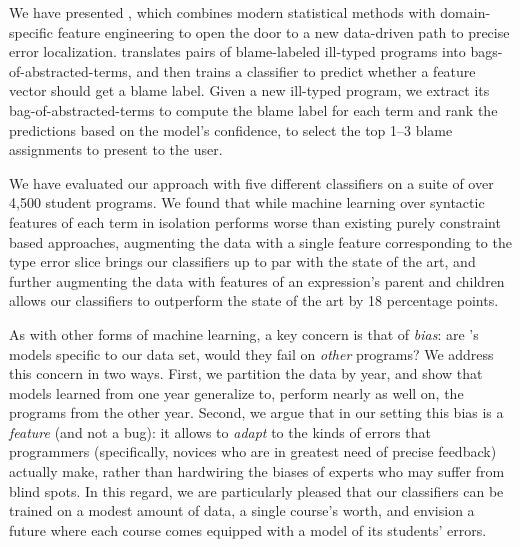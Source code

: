 \label{sec:conclusion}

We have presented \toolname, which
combines modern statistical methods
with domain-specific feature engineering
to open the door to a new data-driven
path to precise error localization.
%
\toolname
translates pairs of
blame-labeled ill-typed
programs into bags-of-abstracted-terms,
and then trains a classifier
to predict whether a feature vector
should get a blame label.
%
Given a new ill-typed program,
we extract its bag-of-abstracted-terms
to compute the blame label for each
term and rank the predictions based
on the model's confidence, to select
the top 1--3 blame assignments to
present to the user.

We have evaluated our approach with
five different classifiers on a suite
of over 4,500 student programs.
%
We found that while machine learning
over syntactic features of each term in isolation
performs worse than existing
purely constraint based approaches, %
augmenting the data with a single feature corresponding to
the type error slice brings our
classifiers up to par with the state of the art,
and further augmenting the data with
features of an expression's parent and children
allows our classifiers to outperform
the state of the art by 18 percentage points.



As with other forms of machine learning,
a key concern is that of \emph{bias}: are
\toolname's models specific
to our data set, would they fail on
\emph{other} programs?
%
We address this concern in two ways.
%
First, we partition the data by year,
and show that models learned from one
year generalize to, \ie perform nearly
as well on, the programs from the other
year.
%
Second, we argue that in our setting
this bias is a \emph{feature} (and not
a bug): it allows \toolname to \emph{adapt}
to the kinds of errors that programmers
(specifically, novices who are in greatest
need of precise feedback) actually make,
rather than hardwiring the biases of
experts who %
may suffer from blind spots. %
%
In this regard, we are particularly pleased
that our classifiers can be trained on a
modest amount of data, \ie a single course's
worth, and envision a future where each course
comes equipped with a model of its students' errors.



